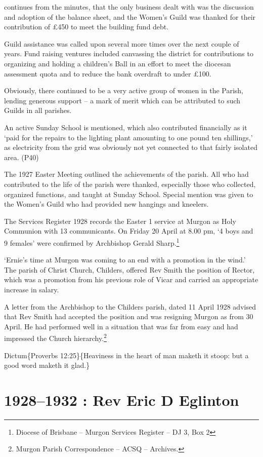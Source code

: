 continues from the minutes, that the only business dealt with was the discussion and adoption of the balance sheet, and the Women's Guild was thanked for their contribution of £450 to meet the building fund debt.

Guild assistance was called upon several more times over the next couple of years. Fund raising ventures included canvassing the district for contributions to organizing and holding a children's Ball in an effort to meet the diocesan assessment quota and to reduce the bank overdraft to under £100.

Obviously, there continued to be a very active group of women in the Parish, lending generous support -- a mark of merit which can be attributed to such Guilds in all parishes.

An active Sunday School is mentioned, which also contributed financially as it `paid for the repairs to the lighting plant amounting to one pound ten shillings,' as electricity from the grid was obviously not yet connected to that fairly isolated area. (P40)

The 1927 Easter Meeting outlined the achievements of the parish. All who had contributed to the life of the parish were thanked, especially those who collected, organized functions, and taught at Sunday School. Special mention was given to the Women's Guild who had provided new hangings and kneelers.

The Services Register 1928 records the Easter 1 service at Murgon as Holy Communion with 13 communicants. On Friday 20 April at 8.00 pm, `4 boys and 9 females' were confirmed by Archbishop Gerald Sharp.\footnote{Diocese of Brisbane -- Murgon Services Register -- DJ 3, Box 2}

`Ernie's time at Murgon was coming to an end with a promotion in the wind.' The parish of Christ Church, Childers, offered Rev Smith the position of Rector, which was a promotion from his previous role of Vicar and carried an appropriate increase in salary.

A letter from the Archbishop to the Childers parish, dated 11 April 1928 advised that Rev Smith had accepted the position and was resigning Murgon as from 30 April. He had performed well in a situation that was far from easy and had impressed the Church hierarchy.\footnote{Murgon Parish Correspondence -- ACSQ -- Archives.}

Dictum\{Proverbs 12:25\}\{Heaviness in the heart of man maketh it stoop: but a good word maketh it glad.\}

\hypertarget{rev-eric-d-eglinton}{%
\chapter{1928--1932 : Rev Eric D Eglinton}\label{rev-eric-d-eglinton}}

